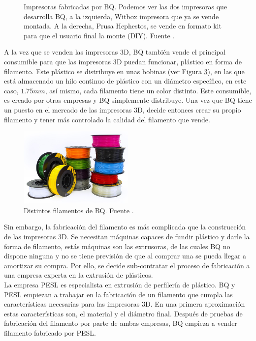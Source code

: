 \begin{figure}[!h]
\begin{subfigure}[b]{0.3\textwidth}
        \label{fig:estado_hephestos}
    \end{subfigure}
    \caption[Impresoras fabricadas por BQ.]{Impresoras fabricadas por BQ. Podemos ver las dos impresoras que desarrolla BQ, a la izquierda, Witbox impresora que ya se vende montada. A la derecha, Prusa Hephestos, se vende en formato kit para que el usuario final la monte (DIY). Fuente \cite{bq}.}
    \label{fig:impresoras_bq}
\end{figure}

A la vez que se venden las impresoras 3D, BQ también vende el principal consumible para que las impresoras 3D puedan funcionar, plástico en forma de filamento. Este plástico se distribuye en unas bobinas (ver Figura \ref{fig:estado_filamento}), en las que está almacenado un hilo continuo de plástico con un diámetro específico, en este caso, $1.75mm$, así mismo, cada filamento tiene un color distinto. Este consumible, es creado por otras empresas y BQ simplemente distribuye. Una vez que BQ tiene un puesto en el mercado de las impresoras 3D, decide entonces crear su propio filamento y tener más controlado la calidad del filamento que vende.

\begin{figure}[!ht]
    \centering
    \includegraphics[width=0.5\textwidth]{images/filamento_bq.png}
    \caption[Distintos filamentos de BQ.]{Distintos filamentos de BQ. Fuente \cite{bq}.}
    \label{fig:estado_filamento}
\end{figure}

Sin embargo, la fabricación del filamento es más complicada que la construcción de las impresoras 3D. Se necesitan máquinas capaces de fundir plástico y darle la forma de filamento, estás máquinas son las extrusoras, de las cuales BQ no dispone ninguna y no se tiene previsión de que al comprar una se pueda llegar a amortizar su compra. Por ello, se decide sub-contratar el proceso de fabricación a una empresa experta en la extrusión de plásticos.\\

La empresa PESL es especialista en extrusión de perfilería de plástico. BQ y PESL empiezan a trabajar en la fabricación de un filamento que cumpla las características necesarias para las impresoras 3D. En una primera aproximación estas características son, el material y el diámetro final. Después de pruebas de fabricación del filamento por parte de ambas empresas, BQ empieza a vender filamento fabricado por PESL.\\

